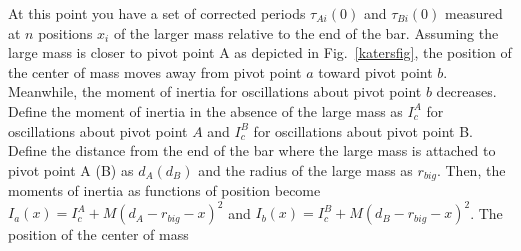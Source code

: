 \documentclass{revtex4}
\begin{document}

At this point you have a set of corrected periods $\tau_{Ai}(0)$ and
$\tau_{Bi}(0)$ measured at $n$ positions $x_i$ of the larger
mass relative to the end of the bar. Assuming the large mass is closer
to pivot point A as depicted in Fig.~\ref{katersfig}, the position of
the center of mass moves away from pivot point $a$ toward pivot point
$b$. Meanwhile, the moment of inertia for oscillations about pivot
point $b$ decreases. Define the moment of inertia in the absence of
the large mass as $I_c^A$ for oscillations about pivot point $A$ and
$I_c^B$ for oscillations about pivot point B. Define the distance from
the end of the bar where the large mass is attached to pivot point A (B) as $d_A (d_B)$ and the radius
of the large mass as $r_{big}$. Then, the
moments of inertia as functions of position become $I_a (x) = I_c^A +
M(d_A - r_{big} - x)^2$ and $I_b(x) = I_c^B + M(d_B - r_{big} -
x)^2$. The position of the center of mass 
\end{document}
